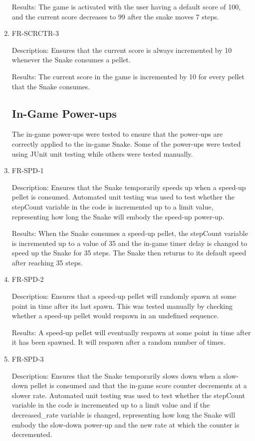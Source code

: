 \documentclass[12pt, titlepage]{article}
\begin{document}
\begin{enumerate}
Results: The game is activated with the user having a default score of 100, and the current score decreases to 99 after the snake moves 7 steps.

\item{FR-SCRCTR-3}
\label{fr:scrctr-3}

Description: Ensures that the current score is always incremented by 10 whenever the Snake consumes a pellet.

Results: The current score in the game is incremented by 10 for every pellet that the Snake consumes.

\subsection{In-Game Power-ups}
The in-game power-ups were tested to ensure that the power-ups are correctly applied to the in-game Snake. Some of the power-ups were tested using JUnit unit testing while others were tested manually.

\item{FR-SPD-1}
\label{fr:spd-1}

Description: Ensures that the Snake temporarily speeds up when a speed-up pellet is consumed. Automated unit testing was used to test whether the stepCount variable in the code is incremented up to a limit value, representing how long the Snake will embody the speed-up power-up.

Results: When the Snake consumes a speed-up pellet, the stepCount variable is incremented up to a value of 35 and the in-game timer delay is changed to speed up the Snake for 35 steps. The Snake then returns to its default speed after reaching 35 steps.

\item{FR-SPD-2}
\label{fr:spd-2}

Description: Ensures that a speed-up pellet will randomly spawn at some point in time after its last spawn. This was tested manually by checking whether a speed-up pellet would respawn in an undefined sequence.

Results: A speed-up pellet will eventually respawn at some point in time after it has  been spawned. It will respawn after a random number of times.

\item{FR-SPD-3}
\label{fr:spd-3}

Description: Ensures that the Snake temporarily slows down when a slow-down pellet is consumed and that the in-game score counter decrements at a slower rate. Automated unit testing was used to test whether the stepCount variable in the code is incremented up to a limit value and if the decreased\_rate variable is changed, representing how long the Snake will embody the slow-down power-up and the new rate at which the counter is decremented. 


\end{enumerate}
\end{document}
